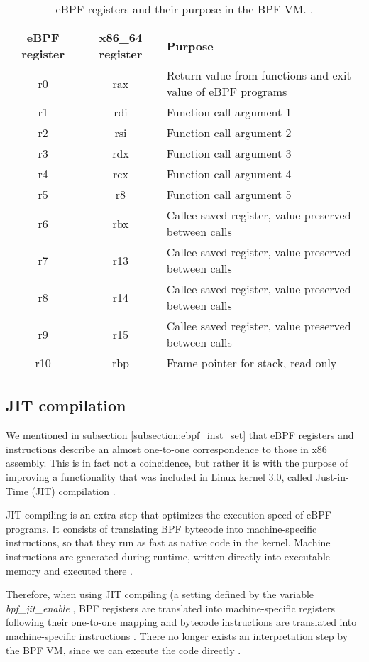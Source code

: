\begin{table}[htbp]
\begin{tabular}{|c|c|m{21em}|}
\hline
eBPF register & x86\_64 register & Purpose\\
\hline
r0 & rax & Return value from functions and exit value of eBPF programs\\
r1 & rdi & Function call argument 1\\
r2 & rsi & Function call argument 2\\
r3 & rdx & Function call argument 3\\
r4 & rcx & Function call argument 4\\
r5 & r8 & Function call argument 5\\
r6 & rbx & Callee saved register, value preserved between calls\\
r7 & r13 & Callee saved register, value preserved between calls\\
r8 & r14 & Callee saved register, value preserved between calls\\
r9 & r15 & Callee saved register, value preserved between calls\\
r10 & rbp & Frame pointer for stack, read only\\
\hline
\end{tabular}
\caption{eBPF registers and their purpose in the BPF VM. \cite{ebpf_inst_set} \cite{ebpf_starovo_slides}.}
\label{table:ebpf_regs}
\end{table}

\subsection{JIT compilation}
We mentioned in subsection \ref{subsection:ebpf_inst_set} that eBPF registers and instructions describe an almost one-to-one correspondence to those in x86 assembly. This is in fact not a coincidence, but rather it is with the purpose of improving a functionality that was included in Linux kernel 3.0, called Just-in-Time (JIT) compilation \cite{ebpf_JIT} \cite{ebpf_JIT_demystify_page13}.

JIT compiling is an extra step that optimizes the execution speed of eBPF programs. It consists of translating BPF bytecode into machine-specific instructions, so that they run as fast as native code in the kernel. Machine instructions are generated during runtime, written directly into executable memory and executed there \cite{ebpf_JIT_demystify_page14}.

Therefore, when using JIT compiling (a setting defined by the variable \textit{bpf\_jit\_enable} \cite{jit_enable_setting}, BPF registers are translated into machine-specific registers following their one-to-one mapping and bytecode instructions are translated into machine-specific instructions \cite{ebpf_starovo_slides_page23}. There no longer exists an interpretation step by the BPF VM, since we can execute the code directly \cite{brendan_gregg_bpf_book_bpf_vm}.

